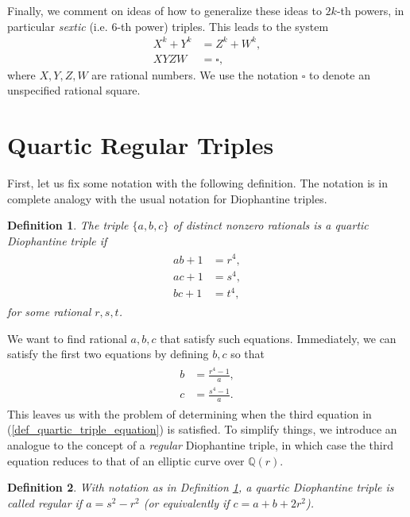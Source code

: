 \documentclass{amsart}
\newtheorem{definition}{Definition}
\begin{document}
Finally, we comment on ideas of how to generalize these ideas to $2k$-th powers, in particular \emph{sextic} (i.e. $6$-th power) triples. This leads to the system 
\begin{align*}
    X^k+Y^k&=Z^k+W^k, \\ 
    XYZW&=\square,
\end{align*}
where $X,Y,Z,W$ are rational numbers.
We use the notation $\square$ to denote an unspecified rational square.

\section{Quartic Regular Triples}
First, let us fix some notation with the following definition. The notation is in complete analogy with the usual notation for Diophantine triples.  
\begin{definition}\label{def_quartic_triple}
The triple $\{a,b,c\}$ of distinct nonzero rationals is a \emph{quartic} Diophantine triple if
\begin{align} \label{def_quartic_triple_equation}
\begin{split}
    ab+1&=r^4, \\
    ac+1&=s^4, \\
    bc+1&=t^4,
\end{split}
\end{align}
for some rational $r,s,t$.
\end{definition}

We want to find rational $a,b,c$ that satisfy such equations. Immediately, we can satisfy the first two equations by defining $b,c$ so that
\begin{align} \label{b,c_parametrization}
\begin{split}
    b &= \frac{r^4-1}{a}, \\
    c &= \frac{s^4-1}{a}.
\end{split}
\end{align}
This leaves us with the problem of determining when the third equation in (\ref{def_quartic_triple_equation}) is satisfied. To simplify things, we introduce an analogue to the concept of a \emph{regular} Diophantine triple, in which case the third equation reduces to that of an elliptic curve over $\mathbb{Q}(r)$.

\begin{definition} \label{def_regularity}
    With notation as in Definition 
 \ref{def_quartic_triple}, a quartic Diophantine triple is called \emph{regular} if $a=s^2-r^2$ (or equivalently if $c = a+b+2r^2$).
\end{definition}
\end{document}
